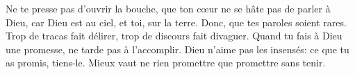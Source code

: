 Ne te presse pas d’ouvrir la bouche, que ton cœur ne se hâte pas de parler à Dieu,
	car Dieu est au ciel, et toi, sur la terre.
	Donc, que tes paroles soient rares.
Trop de tracas fait délirer, trop de discours fait divaguer.
Quand tu fais à Dieu une promesse, ne tarde pas à l’accomplir.
	Dieu n’aime pas les insensés: ce que tu as promis, tiens-le.
Mieux vaut ne rien promettre que promettre sans tenir.
